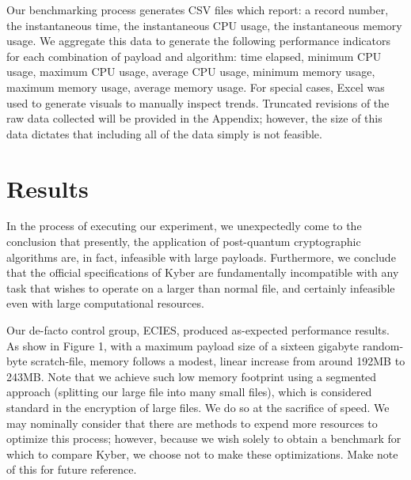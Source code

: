 \documentclass[a4paper]{article}
\begin{document}
Our benchmarking process generates CSV files
which report: a record number, the instantaneous time, the instantaneous
CPU usage, the instantaneous memory usage. We aggregate this data to
generate the following performance indicators for each combination of
payload and algorithm: time elapsed, minimum CPU usage, maximum CPU
usage, average CPU usage, minimum memory usage, maximum memory usage,
average memory usage. For special cases, Excel was used to generate
visuals to manually inspect trends. Truncated revisions of the raw data
collected will be provided in the Appendix; however, the size of this
data dictates that including all of the data simply is not feasible.

\section{Results}\label{results}

In the process of executing our experiment, we unexpectedly come to the
conclusion that presently, the application of post-quantum cryptographic
algorithms are, in fact, infeasible with large payloads. Furthermore, we
conclude that the official specifications of Kyber are fundamentally
incompatible with any task that wishes to operate on a larger than
normal file, and certainly infeasible even with large computational
resources.

Our de-facto control group, ECIES, produced as-expected performance
results. As show in Figure 1, with a maximum payload size of a sixteen
gigabyte random-byte scratch-file, memory follows a modest, linear
increase from around 192MB to 243MB. Note that we achieve such low
memory footprint using a segmented approach (splitting our large file
into many small files), which is considered standard in the encryption
of large files. We do so at the sacrifice of speed. We may nominally
consider that there are methods to expend more resources to optimize
this process; however, because we wish solely to obtain a benchmark for
which to compare Kyber, we choose not to make these optimizations. Make
note of this for future reference.
\end{document}
